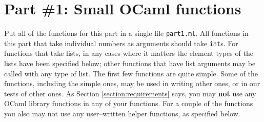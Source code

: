 \documentclass[11pt]{article}
\begin{document}
  \section{Part \#1: Small OCaml functions}

    Put all of the functions for this part in a single file \texttt{part1.ml}.
  All functions in this part that take individual numbers as arguments
  should take \texttt{int}s.  For functions that take lists, in any cases
  where it matters the element types of the lists have been specified below;
  other functions that have list arguments may be called with any type of
  list.  The first few functions are quite simple.  Some of the functions,
  including the simple ones, may be used in writing other ones, or in our
  tests of other ones.  As Section \ref{section:requirements} says, you may
  \textbf{not} use any OCaml library functions in any of your functions.
  For a couple of the functions you also may not use any user--written
  helper functions, as specified below.

    \vspace{-2.5mm}
\end{document}
